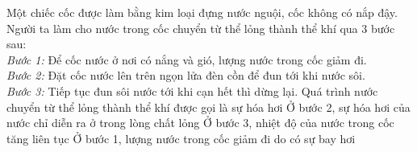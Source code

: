 	\begin{ex}%
		Một chiếc cốc được làm bằng kim loại đựng nước nguội, cốc không có nắp đậy. Người ta làm cho nước trong cốc chuyển từ thể lỏng thành thể khí qua $3$ bước sau:\\
		\textit{Bước 1:} Để cốc nước ở nơi có nắng và gió, lượng nước trong cốc giảm đi.\\
		\textit{Bước 2:} Đặt cốc nước lên trên ngọn lửa đèn cồn để đun tới khi nước sôi.\\
		\textit{Bước 3:} Tiếp tục đun sôi nước tới khi cạn hết thì dừng lại.
		\choiceTFt
		{\True Quá trình nước chuyển từ thể lỏng thành thể khí được gọi là sự hóa hơi}
		{Ở bước 2, sự hóa hơi của nước chỉ diễn ra ở trong lòng chất lỏng}
		{Ở bước 3, nhiệt độ của nước trong cốc tăng liên tục}
		{\True Ở bước 1, lượng nước trong cốc giảm đi do có sự bay hơi}
	\end{ex}

